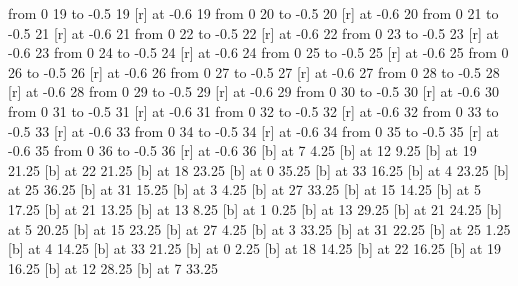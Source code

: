 \putrule from 0 19 to -0.5 19
 [r] at -0.6 19
\putrule from 0 20 to -0.5 20
 [r] at -0.6 20
\putrule from 0 21 to -0.5 21
 [r] at -0.6 21
\putrule from 0 22 to -0.5 22
 [r] at -0.6 22
\putrule from 0 23 to -0.5 23
 [r] at -0.6 23
\putrule from 0 24 to -0.5 24
 [r] at -0.6 24
\putrule from 0 25 to -0.5 25
 [r] at -0.6 25
\putrule from 0 26 to -0.5 26
 [r] at -0.6 26
\putrule from 0 27 to -0.5 27
 [r] at -0.6 27
\putrule from 0 28 to -0.5 28
 [r] at -0.6 28
\putrule from 0 29 to -0.5 29
 [r] at -0.6 29
\putrule from 0 30 to -0.5 30
 [r] at -0.6 30
\putrule from 0 31 to -0.5 31
 [r] at -0.6 31
\putrule from 0 32 to -0.5 32
 [r] at -0.6 32
\putrule from 0 33 to -0.5 33
 [r] at -0.6 33
\putrule from 0 34 to -0.5 34
 [r] at -0.6 34
\putrule from 0 35 to -0.5 35
 [r] at -0.6 35
\putrule from 0 36 to -0.5 36
 [r] at -0.6 36
 [b] at 7 4.25
 [b] at 12 9.25
 [b] at 19 21.25
 [b] at 22 21.25
 [b] at 18 23.25
 [b] at 0 35.25
 [b] at 33 16.25
 [b] at 4 23.25
 [b] at 25 36.25
 [b] at 31 15.25
 [b] at 3 4.25
 [b] at 27 33.25
 [b] at 15 14.25
 [b] at 5 17.25
 [b] at 21 13.25
 [b] at 13 8.25
 [b] at 1 0.25
 [b] at 13 29.25
 [b] at 21 24.25
 [b] at 5 20.25
 [b] at 15 23.25
 [b] at 27 4.25
 [b] at 3 33.25
 [b] at 31 22.25
 [b] at 25 1.25
 [b] at 4 14.25
 [b] at 33 21.25
 [b] at 0 2.25
 [b] at 18 14.25
 [b] at 22 16.25
 [b] at 19 16.25
 [b] at 12 28.25
 [b] at 7 33.25
\endpicture
\vfil\eject\bye
